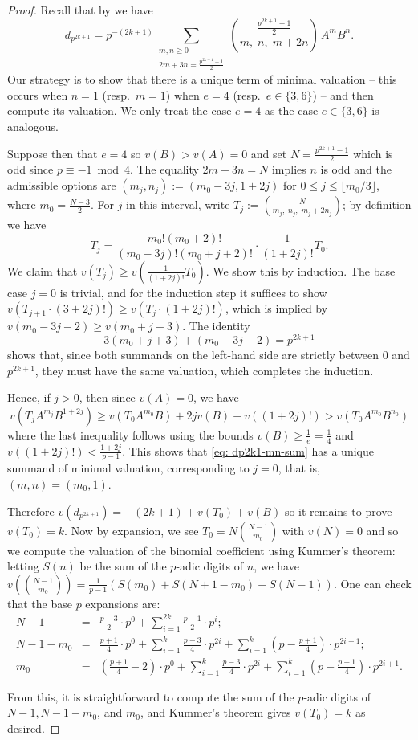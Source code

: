 \documentclass{amsart}
\theoremstyle{definition}
\numberwithin{theorem}{section}
\numberwithin{equation}{section}
\begin{document}
\begin{proof}
Recall that by  we have
\begin{equation}\label{eq: dp2k1-mn-sum}
d_{p^{2k+1}}
=
p^{-(2k+1)}
\sum_{\substack{m,n\ge 0\\ 2m+3n=\frac{p^{2k+1}-1}{2}}}
\binom{\frac{p^{2k+1}-1}{2}}{m,\;n,\;m+2n}\,A^mB^n.
\end{equation}
Our strategy is to show that there is a unique term of minimal valuation -- this occurs when $n=1$ (resp.~$m=1$) when $e=4$ (resp.~$e \in \{3,6\}$) -- and then compute its valuation. We only treat the case $e=4$ as the case $e \in \{3,6\}$ is analogous. 

Suppose then that $e=4$ so $v(B)>v(A)=0$ and set $N=\frac{p^{2k+1}-1}{2}$ which is odd since $p \equiv -1 \bmod{4}$. The equality $2m+3n=N$ implies $n$ is odd and the admissible options are $(m_j,n_j):=(m_0-3j,1+2j)$ for $0\leq j \leq \lfloor m_0/3 \rfloor$, where $m_0=\frac{N-3}{2}$.
For $j$ in this interval, write $T_j:=\binom{N}{m_j,\;n_j,\;m_j+2n_j}$; by definition we have
\[
T_j = \frac{m_0!(m_0+2)!}{(m_0-3j)!(m_0+j+2)!} \cdot \frac{1}{(1+2j)!}T_0.
\]
We claim that $v(T_j) \geq v(\frac{1}{(1+2j)!}T_0)$. We show this by induction. The base case $j=0$ is trivial, and for the induction step it suffices to show $v(T_{j+1} \cdot (3+2j)!) \geq v(T_j \cdot (1+2j)!)$, which is implied by $v(m_0-3j-2) \geq v(m_0+j+3)$. The identity
\[
3(m_0+j+3) + (m_0-3j-2)= p^{2k+1}
\]
shows that, since both summands on the left-hand side are strictly between $0$ and $p^{2k+1}$, they must have the same valuation, which completes the induction.

Hence, if $j>0$, then since $v(A)=0$, we have 
\[
v(T_jA^{m_j}B^{1+2j})  \geq v(T_0 A^{m_0} B) +2jv(B) - v((1+2j)!) > v(T_0A^{m_0}B^{n_0})
\]
where the last inequality follows using the bounds $v(B) \geq \frac{1}{e}=\frac{1}{4}$ and $v((1+2j)!) < \frac{1+2j}{p-1}$. This shows that \eqref{eq: dp2k1-mn-sum} has a unique summand of minimal valuation, corresponding to $j=0$, that is, $(m,n)=(m_0, 1)$.

Therefore $v(d_{p^{2k+1}})=-(2k+1) + v(T_0)+v(B)$ so it remains to prove $v(T_0)=k$. Now by expansion, we see $T_0=N\binom{N-1}{m_0}$ with $v(N)=0$ and so we compute the valuation of the binomial coefficient using Kummer's theorem: letting $S(n)$ be the sum of the $p$-adic digits of $n$, we have $v \left( \binom{N-1}{m_0} \right)=\frac{1}{p-1}(S(m_0)+S(N+1-m_0)-S(N-1))$.
One can check that the base $p$ expansions are:
\begin{eqnarray*}
    N-1 &=& \tfrac{p-3}{2} \cdot p^0+\sum_{i=1}^{2k} \tfrac{p-1}{2} \cdot p^i; \\
    N-1-m_0 &=& \tfrac{p+1}{4}\cdot p^0 + \sum_{i=1}^k \tfrac{p-3}{4} \cdot p^{2i} + \sum_{i=1}^k (p-\tfrac{p+1}{4}) \cdot p^{2i+1}; \\
    m_0 &=& (\tfrac{p+1}{4} -2)\cdot p^0 + \sum_{i=1}^k \tfrac{p-3}{4} \cdot p^{2i} + \sum_{i=1}^k (p-\tfrac{p+1}{4}) \cdot p^{2i+1}.
\end{eqnarray*}

From this, it is straightforward to compute the sum of the $p$-adic digits of $N-1, N-1-m_0$, and $m_0$, and Kummer's theorem gives $v(T_0)=k$ as desired.
\end{proof}
\end{document}
